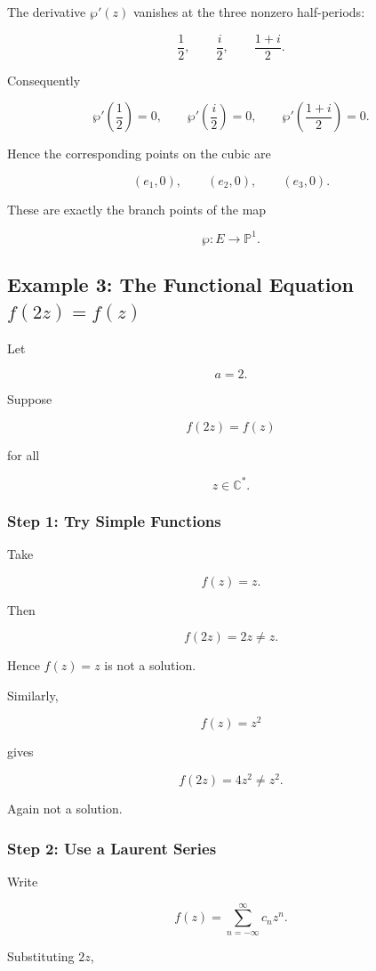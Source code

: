 \documentclass[12pt,a4paper]{article}
\theoremstyle{notespace}
\begin{document}
The derivative \(\wp'(z)\) vanishes at the three nonzero half-periods:

\[
\frac12,
\qquad
\frac{i}{2},
\qquad
\frac{1+i}{2}.
\]

Consequently

\[
\wp'\!\left(\frac12\right)=0,
\qquad
\wp'\!\left(\frac{i}{2}\right)=0,
\qquad
\wp'\!\left(\frac{1+i}{2}\right)=0.
\]

Hence the corresponding points on the cubic are

\[
(e_1,0),
\qquad
(e_2,0),
\qquad
(e_3,0).
\]

These are exactly the branch points of the map

\[
\wp:E\to\mathbb P^1.
\]

\bigskip

\subsection{Example 3: The Functional Equation \(f(2z)=f(z)\)}

Let

\[
a=2.
\]

Suppose

\[
f(2z)=f(z)
\]

for all

\[
z\in\mathbb C^*.
\]

\subsubsection*{Step 1: Try Simple Functions}

Take

\[
f(z)=z.
\]

Then

\[
f(2z)=2z\neq z.
\]

Hence \(f(z)=z\) is not a solution.

Similarly,

\[
f(z)=z^2
\]

gives

\[
f(2z)=4z^2\neq z^2.
\]

Again not a solution.

\subsubsection*{Step 2: Use a Laurent Series}

Write

\[
f(z)
=
\sum_{n=-\infty}^{\infty}
c_n z^n.
\]

Substituting \(2z\),
\end{document}
